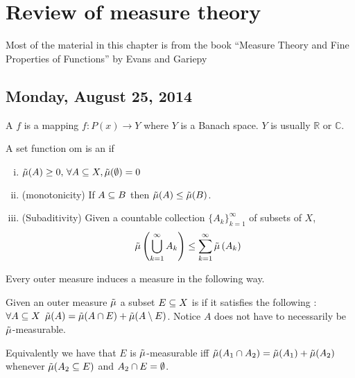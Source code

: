 \chapter{Review of measure theory}

Most of the material in this chapter is from the book ``Measure Theory and Fine Properties of
Functions''  by Evans and Gariepy \cite{evans1991measure}

\section{Monday, August 25, 2014}

\begin{defn}
  A  $f$ is a mapping $f:P(x) \to Y$ where $Y$ is a
  Banach space. $Y$ is usually $\mathbb{R}$ or $\mathbb{C}$.
\end{defn}

\begin{defn}
  A set function \gls{om} is an  if
  \begin{enumerate}[(i)]
    \item $\tilde{\mu}(A)\ge 0,\, \forall A\subseteq X, \tilde{\mu}(\emptyset)=0$
    \item (monotonicity) If $A\subseteq B$ then $\tilde{\mu}(A)\le \tilde{\mu}(B)$.
    \item (Subaditivity) Given a countable collection
      $\{A_k\}_{k=1}^\infty$ of subsets of $X$,
      \begin{equation*}
        \tilde{\mu}\left(\bigcup_{k=1}^\infty A_k\right)\le \sum_{k=1}^\infty \tilde{\mu}\left(A_k\right)
      \end{equation*}
  \end{enumerate}
\end{defn}

\begin{fact}
  Every outer measure induces a measure in the following way.
\end{fact}

\begin{defn}
  Given an outer measure $\tilde{\mu}$ a subset $E\subseteq X$ is  if
  it satisfies the following : $\forall
  A\subseteq X$ $\tilde{\mu}(A) = \tilde{\mu}(A\cap E)+\tilde{\mu}(A\setminus E)$. Notice $A$ does not have
  to necessarily be $\tilde{\mu}$-measurable.

  Equivalently we have that $E$ is $\tilde{\mu}$-measurable iff
  $\tilde{\mu}(A_1\cap A_2) = \tilde{\mu}(A_1)+\tilde{\mu}(A_2)$ whenever $\tilde{\mu}(A_2\subseteq E)$ and
  $A_2\cap E=\emptyset$.
\end{defn}

